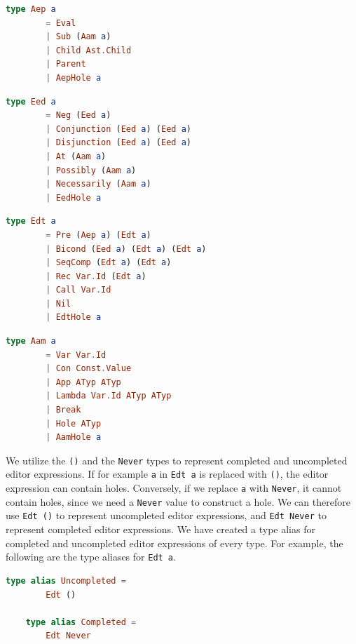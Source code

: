 \begin{lstlisting}[language=elm,%
                   label="aep-definition",%
                   gobble=4,%
                   ]
    type Aep a
        = Eval
        | Sub (Aam a)
        | Child Ast.Child
        | Parent
        | AepHole a
\end{lstlisting}

\begin{lstlisting}[language=elm,%
                   label="eed-definitions",%
                   gobble=4,%
                   ]
    type Eed a
        = Neg (Eed a)
        | Conjunction (Eed a) (Eed a)
        | Disjunction (Eed a) (Eed a)
        | At (Aam a)
        | Possibly (Aam a)
        | Necessarily (Aam a)
        | EedHole a
\end{lstlisting}

\begin{lstlisting}[language=elm,%
                   label="generic-edt-definition",%
                   gobble=4,%
                   ]
    type Edt a
        = Pre (Aep a) (Edt a)
        | Bicond (Eed a) (Edt a) (Edt a)
        | SeqComp (Edt a) (Edt a)
        | Rec Var.Id (Edt a)
        | Call Var.Id
        | Nil
        | EdtHole a
\end{lstlisting}

\begin{lstlisting}[language=elm,%
                   label="aam-definitions",%
                   gobble=4,%
                   ]
    type Aam a
        = Var Var.Id
        | Con Const.Value
        | App ATyp ATyp
        | Lambda Var.Id ATyp ATyp
        | Break
        | Hole ATyp
        | AamHole a
\end{lstlisting}

We utilize the \texttt{()} and the \texttt{Never} types to represent
completed and uncompleted editor expressions. If for example \texttt{a} in
\texttt{Edt a} is replaced with \texttt{()}, the editor expression can contain
holes. Conversely, if we replace \texttt{a} with \texttt{Never}, it cannot
contain holes, since we need a \texttt{Never} value to construct a hole. We can
therefore use \texttt{Edt ()} to represent uncompleted editor expressions, and
\texttt{Edt Never} to represent completed editor expressions. We have created a
type alias for completed and uncompleted editor expressions of every type. For
example, the following are the type aliases for \texttt{Edt a}.

\begin{lstlisting}[language=elm,%
                   label="completed-and-uncompleted-edts",%
                   gobble=4,%
                   ]
    type alias Uncompleted =
        Edt ()

    type alias Completed =
        Edt Never
\end{lstlisting}

